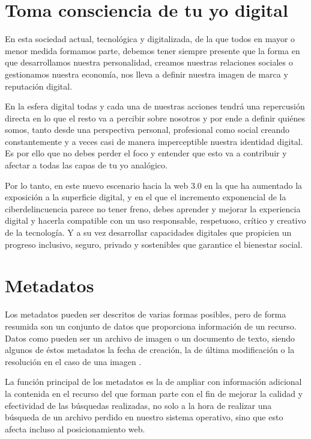 \documentclass[
  spanish,
  a4paper,
  openany]{book}
\begin{document}
\hypertarget{toma-consciencia-de-tu-yo-digital}{%
\section{Toma consciencia de tu yo digital}\label{toma-consciencia-de-tu-yo-digital}}

En esta sociedad actual, tecnológica y digitalizada, de la que todos en mayor o menor medida formamos parte, debemos tener siempre presente que la forma en que desarrollamos nuestra personalidad, creamos nuestras relaciones sociales o gestionamos nuestra economía, nos lleva a definir nuestra imagen de marca y reputación digital.

En la esfera digital todas y cada una de nuestras acciones tendrá una repercusión directa en lo que el resto va a percibir sobre nosotros y por ende a definir quiénes somos, tanto desde una perspectiva personal, profesional como social creando constantemente y a veces casi de manera imperceptible nuestra identidad digital. Es por ello que no debes perder el foco y entender que esto va a contribuir y afectar a todas las capas de tu yo analógico.

Por lo tanto, en este nuevo escenario hacia la web 3.0 en la que ha aumentado la exposición a la superficie digital, y en el que el incremento exponencial de la ciberdelincuencia parece no tener freno, debes aprender y mejorar la experiencia digital y hacerla compatible con un uso responsable, respetuoso, crítico y creativo de la tecnología. Y a su vez desarrollar capacidades digitales que propicien un progreso inclusivo, seguro, privado y sostenibles que garantice el bienestar social.

\hypertarget{metadatos}{%
\section{Metadatos}\label{metadatos}}

Los metadatos pueden ser descritos de varias formas posibles, pero de forma resumida son un conjunto de datos que proporciona información de un recurso. Datos como pueden ser un archivo de imagen o un documento de texto, siendo algunos de éstos metadatos la fecha de creación, la de última modificación o la resolución en el caso de una imagen \citep{WIKI-meta}.

La función principal de los metadatos es la de ampliar con información adicional la contenida en el recurso del que forman parte con el fin de mejorar la calidad y efectividad de las búsquedas realizadas, no solo a la hora de realizar una búsqueda de un archivo perdido en nuestro sistema operativo, sino que esto afecta incluso al posicionamiento web.
\end{document}

